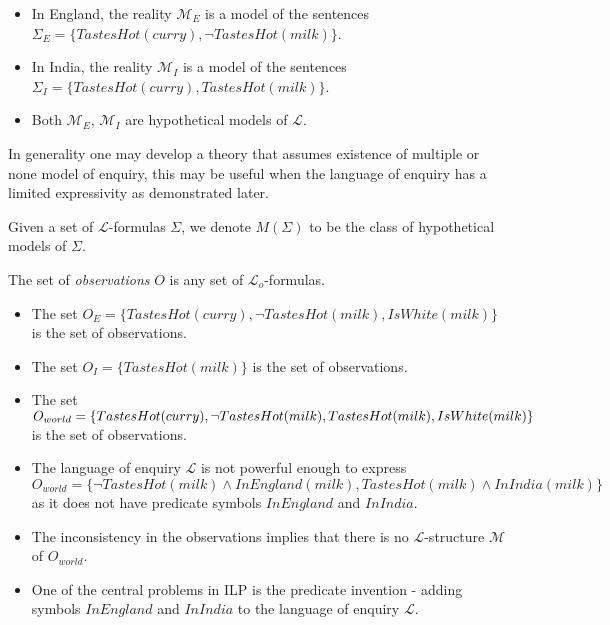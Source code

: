 \begin{exmp}
\begin{itemize}
\item In England, the reality $\mathcal{M}_E$ is a model of the sentences\\ $\Sigma_E=\{TastesHot(curry), \neg TastesHot(milk)\}$.
\item In India, the reality $\mathcal{M}_I$ is a model of the sentences\\ $\Sigma_I=\{TastesHot(curry), TastesHot(milk)\}$.
\item Both $\mathcal{M}_E$, $\mathcal{M}_I$ are hypothetical models of $\mathcal{L}$.
\end{itemize}
\end{exmp}

\begin{remark}
In generality one may develop a theory that assumes existence of multiple or none model of enquiry, this may be useful when the language of enquiry has a limited expressivity as demonstrated later.
\end{remark}

\begin{notation}
Given a set of $\mathcal{L}$-formulas $\Sigma$, we denote $M(\Sigma)$ to be the class of hypothetical models of $\Sigma$.
\end{notation}

\begin{defn}
The set of \emph{observations} $O$ is any set of $\mathcal{L}_o$-formulas.
\end{defn}

\begin{exmp}
\begin{itemize}
\item The set $O_E=\{TastesHot(curry), \neg TastesHot(milk), IsWhite(milk)\}$ is the set of observations.
\item The set $O_I=\{TastesHot(milk)\}$ is the set of observations.
\item The set $O_{world}=\{TastesHot(curry), \neg TastesHot(milk), TastesHot(milk), \\
IsWhite(milk)\}$ is the set of observations.
\end{itemize}
\end{exmp}

\begin{remark}
\begin{itemize}
\item The language of enquiry $\mathcal{L}$ is not powerful enough to express $O_{world}=\{\neg TastesHot(milk) \land InEngland(milk), TastesHot(milk) \land InIndia(milk)\}$
 as it does not have predicate symbols $InEngland$ and $InIndia$.
\item The inconsistency in the observations implies that there is no $\mathcal{L}$-structure $\mathcal{M}$ of $O_{world}$.
\item One of the central problems in ILP is the predicate invention - adding symbols $InEngland$ and $InIndia$ to the language of enquiry $\mathcal{L}$.
\end{itemize}
\end{remark}

